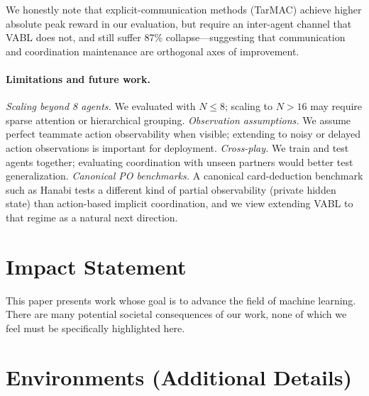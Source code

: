 \documentclass{article}
\theoremstyle{plain}
\theoremstyle{definition}
\theoremstyle{remark}
\begin{document}
We honestly note that explicit-communication methods (TarMAC) achieve higher absolute peak reward in our evaluation, but require an inter-agent channel that VABL does not, and still suffer 87\% collapse---suggesting that communication and coordination maintenance are orthogonal axes of improvement.

\paragraph{Limitations and future work.}
\textit{Scaling beyond 8 agents.} We evaluated with $N \leq 8$; scaling to $N > 16$ may require sparse attention or hierarchical grouping. \textit{Observation assumptions.} We assume perfect teammate action observability when visible; extending to noisy or delayed action observations is important for deployment. \textit{Cross-play.} We train and test agents together; evaluating coordination with unseen partners would better test generalization. \textit{Canonical PO benchmarks.} A canonical card-deduction benchmark such as Hanabi tests a different kind of partial observability (private hidden state) than action-based implicit coordination, and we view extending VABL to that regime as a natural next direction.


\section{Impact Statement}

This paper presents work whose goal is to advance the field of machine learning. There are many potential societal consequences of our work, none of which we feel must be specifically highlighted here.




\newpage
\appendix
\onecolumn

\section{Environments (Additional Details)}
\label{app:env_details}
\end{document}
